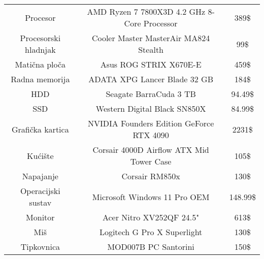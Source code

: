 \documentclass{article}
\begin{document}
\begin{tabular}{c|c|c}
    Procesor & AMD Ryzen 7 7800X3D 4.2 GHz 8-Core Processor & 389\$\\
    Procesorski hladnjak & Cooler Master MasterAir MA824 Stealth & 99\$\\
    Matična ploča & Asus ROG STRIX X670E-E & 459\$\\
    Radna memorija & ADATA XPG Lancer Blade 32 GB & 184\$\\
    HDD & Seagate BarraCuda 3 TB & 94.49\$\\
    SSD & Western Digital Black SN850X & 84.99\$\\
    Grafička kartica & NVIDIA Founders Edition GeForce RTX 4090 & 2231\$\\
    Kućište & Corsair 4000D Airflow ATX Mid Tower Case & 105\$\\
    Napajanje & Corsair RM850x & 130\$\\
    Operacijski sustav & Microsoft Windows 11 Pro OEM & 148.99\$\\
    Monitor & Acer Nitro XV252QF 24.5" & 613\$\\
    Miš & Logitech G Pro X Superlight & 130\$\\
    Tipkovnica & MOD007B PC Santorini & 150\$\\
    
\end{tabular}
\end{document}
